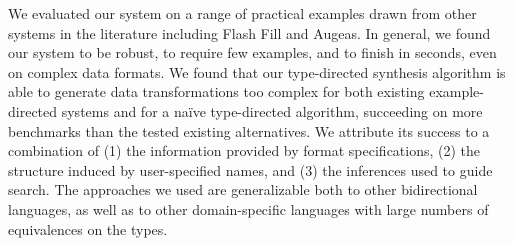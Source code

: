 \documentclass[sigplan,acmsmall]{acmart}
\begin{document}
We evaluated our system on a range of practical examples drawn from
other systems in the literature including Flash Fill and Augeas.  In
general, we found our system to be robust, to require few examples,
and to finish in seconds, even on complex data formats.  We found that our
type-directed synthesis algorithm is able to generate data
transformations too complex for both existing example-directed systems and for a
na\"{i}ve type-directed algorithm, succeeding on \NumMoreThanFlashFill{} more
benchmarks than 
the tested existing alternatives.
We attribute its success to a combination of (1) the information provided
by format specifications, (2) the structure induced by user-specified
names, and (3) the inferences used to guide search.
The approaches we used are generalizable both to other bidirectional languages,
as well as to other domain-specific languages with large numbers of equivalences
on the types.





\end{document}
